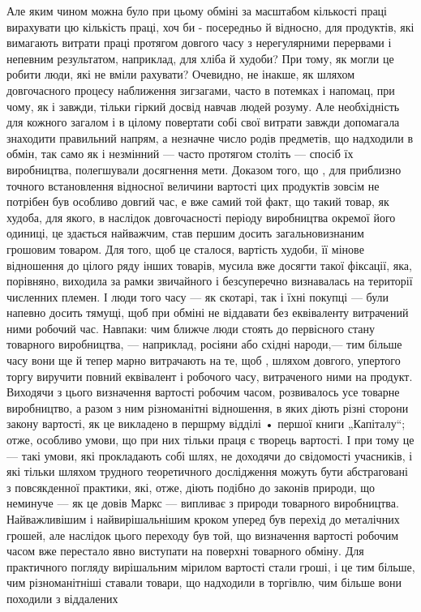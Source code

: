 Але яким чином можна було при цьому обміні за масштабом кількості праці вирахувати цю кількість праці, хоч би - посередньо й
відносно, для продуктів, які вимагають витрати праці протягом довгого часу з нерегулярними перервами і непевним результатом,
наприклад, для хліба й худоби? При тому, як могли це робити люди, які не вміли рахувати? Очевидно, не інакше, як шляхом
довгочасного процесу наближення зигзагами, часто в потемках і напомац, при чому, як і завжди, тільки гіркий досвід навчав
людей розуму. Але необхідність для кожного загалом і в цілому повертати собі свої витрати завжди допомагала знаходити
правильний напрям, а незначне число родів предметів, що надходили в обмін, так само як і незмінний — часто протягом століть
— спосіб їх виробництва, полегшували досягнення мети. Доказом того, що , для приблизно точного встановлення відносної
величини вартості цих продуктів зовсім не потрібен був особливо довгий час, е вже самий той факт, що такий товар, як худоба,
для якого, в наслідок довгочасності періоду виробництва окремої його одиниці, це здається найважчим, став першим досить
загальновизнаним грошовим товаром. Для того, щоб це сталося, вартість худоби, її мінове відношення до цілого ряду інших
товарів, мусила вже досягти такої фіксації, яка, порівняно, виходила за рамки звичайного і безсуперечно визнавалась на
території численних племен. І люди того часу — як скотарі, так і їхні покупці — були напевно досить тямущі, щоб при обміні
не віддавати без еквіваленту витрачений ними робочий час. Навпаки: чим ближче люди стоять до первісного стану товарного
виробництва, — наприклад, росіяни або східні народи,—  тим більше часу вони ще й тепер марно витрачають на те, щоб , шляхом
довгого, упертого торгу виручити повний еквівалент і робочого часу, витраченого ними на продукт. Виходячи з цього визначення
вартості робочим часом, розвивалось усе товарне виробництво, а разом з ним різноманітні відношення, в яких діють різні
сторони закону вартості, як це викладено в першрму відділі • першої книги „Капіталу“; отже, особливо умови, що при них
тільки праця є творець вартості. І при тому це — такі умови, які прокладають собі шлях, не доходячи до свідомості учасників,
і які тільки шляхом трудного теоретичного дослідження можуть бути абстраговані з повсякденної практики, які, отже, діють
подібно до законів природи, що неминуче — як це довів Маркс — випливає з природи товарного виробництва. Найважливішим і
найвирішальнішим кроком уперед був перехід до металічних грошей, але наслідок цього переходу був той, що визначення вартості
робочим часом вже перестало явно виступати на поверхні товарного обміну. Для практичного погляду вирішальним мірилом
вартості стали гроші, і це тим більше, чим різноманітніші ставали товари, що надходили в торгівлю, чим більше вони походили
з віддалених
\parbreak{}  %
